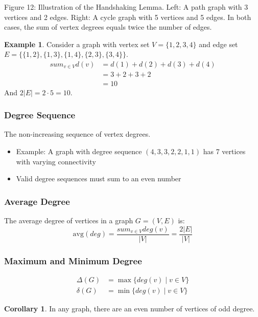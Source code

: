 \documentclass{article}
\theoremstyle{definition}
\newtheorem{example}{Example}
\def\deg{deg}%
\def\sum{sum}%
\newtheorem{corollary}{Corollary}
\begin{document}
\vspace{0.3cm}
{\centering
\footnotesize Figure 12: Illustration of the Handshaking Lemma. Left: A path graph with 3 vertices and 2 edges. Right: A cycle graph with 5 vertices and 5 edges. In both cases, the sum of vertex degrees equals twice the number of edges.
\par}
\begin{example}
Consider a graph with vertex set $V = \{1, 2, 3, 4\}$ and edge set $E = \{\{1,2\}, \{1,3\}, \{1,4\}, \{2,3\}, \{3,4\}\}$.
\begin{align*}
\sum_{v \in V} d(v) &= d(1) + d(2) + d(3) + d(4)\\
&= 3 + 2 + 3 + 2\\
&= 10
\end{align*}
And $2|E| = 2 \cdot 5 = 10$.
\end{example}

\subsubsection{Degree Sequence}
The non-increasing sequence of vertex degrees.
\begin{itemize}
    \item Example: A graph with degree sequence $(4,3,3,2,2,1,1)$ has 7 vertices with varying connectivity
    \item Valid degree sequences must sum to an even number
\end{itemize}
\subsubsection{Average Degree}
The average degree of vertices in a graph $G = (V,E)$ is:
\begin{equation}
\text{avg}(\deg) = \frac{\sum_{v \in V} \deg(v)}{|V|} = \frac{2|E|}{|V|}
\end{equation}
\subsubsection{Maximum and Minimum Degree}
\begin{align}
\Delta(G) &= \max\{\deg(v) \mid v \in V\} \\
\delta(G) &= \min\{\deg(v) \mid v \in V\}
\end{align}
\begin{corollary}
In any graph, there are an even number of vertices of odd degree.
\end{corollary}
\end{document}
